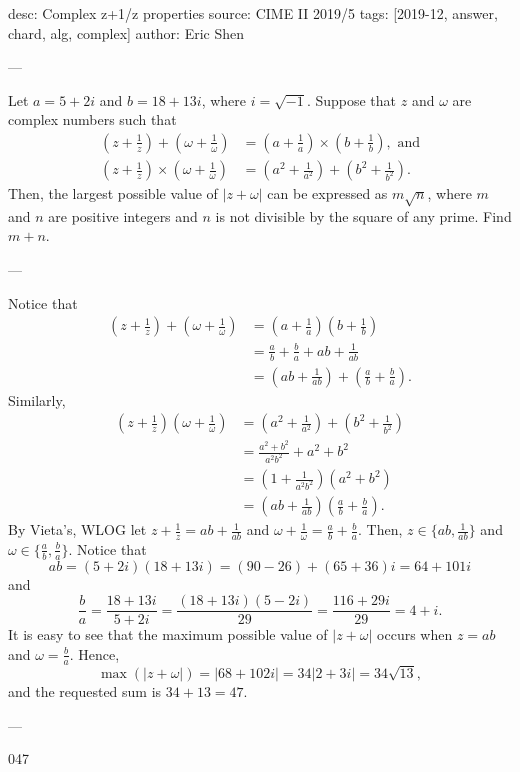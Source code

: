 desc: Complex z+1/z properties
source: CIME II 2019/5
tags: [2019-12, answer, chard, alg, complex]
author: Eric Shen

---

Let $a=5+2i$ and $b=18+13i$, where $i=\sqrt{-1}$. Suppose that $z$ and $\omega$ are complex numbers such that
\begin{align*}
    \left(z+\frac1z\right)+\left(\omega+\frac1\omega\right)&=\left(a+\frac1a\right)\times\left(b+\frac1b\right),\text{ and}\\
    \left(z+\frac1z\right)\times\left(\omega+\frac1\omega\right)&=\left(a^2+\frac1{a^2}\right)+\left(b^2+\frac1{b^2}\right).
\end{align*}
Then, the largest possible value of $|z+\omega|$ can be expressed as $m\sqrt n$, where $m$ and $n$ are positive integers and $n$ is not divisible by the square of any prime. Find $m+n$.

---

Notice that
\begin{align*}
    \left(z+\frac1z\right)+\left(\omega+\frac1\omega\right)&=\left(a+\frac1a\right)\left(b+\frac1b\right)\\
    &=\frac ab+\frac ba+ab+\frac1{ab}\\
    &=\left(ab+\frac1{ab}\right)+\left(\frac ab+\frac ba\right).
\end{align*}
Similarly,
\begin{align*}
    \left(z+\frac1z\right)\left(\omega+\frac1\omega\right)&=\left(a^2+\frac1{a^2}\right)+\left(b^2+\frac1{b^2}\right)\\
    &=\frac{a^2+b^2}{a^2b^2}+a^2+b^2\\
    &=\left(1+\frac1{a^2b^2}\right)(a^2+b^2)\\
    &=\left(ab+\frac1{ab}\right)\left(\frac ab+\frac ba\right).
\end{align*}
By Vieta's, WLOG let $z+\tfrac1z=ab+\tfrac1{ab}$ and $\omega+\tfrac1{\omega}=\tfrac ab+\tfrac ba$. Then, $z\in\{ab,\tfrac1{ab}\}$ and $\omega\in\{\tfrac ab,\tfrac ba\}$. Notice that \[ab=(5+2i)(18+13i)=(90-26)+(65+36)i=64+101i\]and \[\frac ba=\frac{18+13i}{5+2i}=\frac{(18+13i)(5-2i)}{29}=\frac{116+29i}{29}=4+i.\]It is easy to see that the maximum possible value of $|z+\omega|$ occurs when $z=ab$ and $\omega=\tfrac ba$. Hence, \[\max(|z+\omega|)=\left|68+102i\right|=34\left|2+3i\right|=34\sqrt{13},\]and the requested sum is $34+13=47$.

---

047
